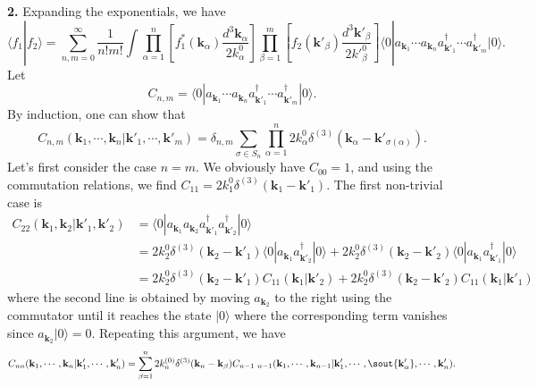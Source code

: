 \textbf{2.} Expanding the exponentials, we have
\begin{equation}
    \langle f_1 | f_2 \rangle = \sum_{n,m=0}^\infty \frac{1}{n!m!} \int \prod_{\alpha=1}^n \left[ f_1^*(\mathbf{k}_\alpha) \frac{d^3\mathbf{k}_\alpha}{2k^0_\alpha} \right] \prod_{\beta=1}^m \left[ f_2(\mathbf{k}'_\beta) \frac{d^3\mathbf{k}'_\beta}{2k'^0_\beta} \right] \langle 0 | a_{\mathbf{k}_1} \cdots a_{\mathbf{k}_n} a^\dagger_{\mathbf{k}'_1} \cdots a^\dagger_{\mathbf{k}'_m} | 0 \rangle.
\end{equation}
Let
\begin{equation}
    C_{n,m} = \langle 0 | a_{\mathbf{k}_1} \cdots a_{\mathbf{k}_n} a^\dagger_{\mathbf{k}'_1} \cdots a^\dagger_{\mathbf{k}'_m} | 0 \rangle.
\end{equation}
By induction, one can show that
\begin{equation}
    C_{n,m}(\mathbf{k}_1, \cdots, \mathbf{k}_n | \mathbf{k}'_1, \cdots, \mathbf{k}'_m) = \delta_{n,m} \sum_{\sigma \in S_n} \prod_{\alpha=1}^n 2k^0_\alpha \delta^{(3)}(\mathbf{k}_\alpha - \mathbf{k}'_{\sigma(\alpha)}).
\end{equation}
Let's first consider the case $n=m$. We obviously have $C_{00} = 1$, and using the commutation relations, we find $C_{11} = 2k^0_1 \delta^{(3)}(\mathbf{k}_1 - \mathbf{k}'_1)$. The first non-trivial case is
\begin{equation}
\begin{aligned}
    C_{22}(\mathbf{k}_1, \mathbf{k}_2 | \mathbf{k}'_1, \mathbf{k}'_2) &= \langle 0 | a_{\mathbf{k}_1} a_{\mathbf{k}_2} a^\dagger_{\mathbf{k}'_1} a^\dagger_{\mathbf{k}'_2} | 0 \rangle \\
    &= 2k^0_2 \delta^{(3)}(\mathbf{k}_2 - \mathbf{k}'_1) \langle 0 | a_{\mathbf{k}_1} a^\dagger_{\mathbf{k}'_2} | 0 \rangle + 2k^0_2 \delta^{(3)}(\mathbf{k}_2 - \mathbf{k}'_2) \langle 0 | a_{\mathbf{k}_1} a^\dagger_{\mathbf{k}'_1} | 0 \rangle \\
    &= 2k^0_2 \delta^{(3)}(\mathbf{k}_2 - \mathbf{k}'_1) C_{11}(\mathbf{k}_1 | \mathbf{k}'_2) + 2k^0_2 \delta^{(3)}(\mathbf{k}_2 - \mathbf{k}'_2) C_{11}(\mathbf{k}_1 | \mathbf{k}'_1)
\end{aligned}
\end{equation}
where the second line is obtained by moving $a_{\mathbf{k}_2}$ to the right using the commutator until it reaches the state $|0\rangle$ where the corresponding term vanishes since $a_{\mathbf{k}_2}|0\rangle = 0$. Repeating this argument, we have
\begin{equation}
    C_{nn}(\mathbf{k}_1, \cdots, \mathbf{k}_n | \mathbf{k}'_1, \cdots, \mathbf{k}'_n) = \sum_{\beta=1}^n 2k^{(0)}_n \delta^{(3)}(\mathbf{k}_n - \mathbf{k}_\beta) C_{n-1 \ n-1}(\mathbf{k}_1, \cdots, \mathbf{k}_{n-1} | \mathbf{k}'_1, \cdots, \sout{\mathbf{k}'_\alpha}, \cdots, \mathbf{k}'_n).
\end{equation}
